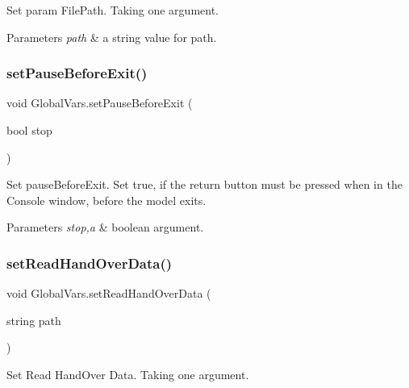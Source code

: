 Set param File\+Path. Taking one argument. 


\begin{DoxyParams}{Parameters}
{\em path} & a string value for path. \\
\hline
\end{DoxyParams}
\mbox{\label{class_global_vars_ac26e11e3695f100eeb3081cd4c0fa3d4}} 
\subsubsection{\texorpdfstring{setPauseBeforeExit()}{setPauseBeforeExit()}}
{\footnotesize\ttfamily void Global\+Vars.\+set\+Pause\+Before\+Exit (\begin{DoxyParamCaption}\item[{bool}]{stop }\end{DoxyParamCaption})\hspace{0.3cm}{\ttfamily [inline]}}



Set pause\+Before\+Exit. Set true, if the return button must be pressed when in the Console window, before the model exits. 


\begin{DoxyParams}{Parameters}
{\em stop,a} & boolean argument. \\
\hline
\end{DoxyParams}
\mbox{\label{class_global_vars_a3d2a46ab9111e91ec5d7108f3b6bb949}} 
\subsubsection{\texorpdfstring{setReadHandOverData()}{setReadHandOverData()}}
{\footnotesize\ttfamily void Global\+Vars.\+set\+Read\+Hand\+Over\+Data (\begin{DoxyParamCaption}\item[{string}]{path }\end{DoxyParamCaption})\hspace{0.3cm}{\ttfamily [inline]}}



Set Read Hand\+Over Data. Taking one argument. 


